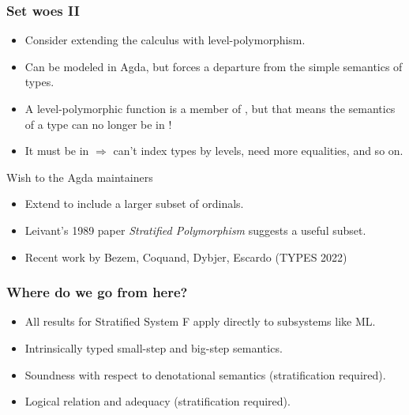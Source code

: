 \documentclass[dvipsnames,aspectratio=169,pdftex]{beamer}
\begin{document}
\begin{frame}
  \frametitle{Set woes II}
  \begin{itemize}
  \item Consider extending the calculus with level-polymorphism.
  \item Can be modeled in Agda, but forces a departure from the simple semantics of types.
  \item A level-polymorphic function is a member of , but that means the semantics of a type can no longer be in  !
  \item It must be in  $\Longrightarrow$ can't index types by levels, need more equalities, and so on.
  \end{itemize}
  \begin{exampleblock}{Wish to the  Agda maintainers}
    \begin{itemize}
    \item Extend  to include a larger subset of ordinals.
    \item Leivant's 1989 paper \emph{Stratified Polymorphism} suggests
      a useful subset.
    \item Recent work by Bezem, Coquand, Dybjer, Escardo (TYPES 2022)
    \end{itemize}
  \end{exampleblock}
\end{frame}
\begin{frame}
  \frametitle{Where do we go from here?}
  \begin{itemize}
  \item All results for Stratified System F apply directly to subsystems like ML.
  \item Intrinsically typed small-step and big-step semantics.
  \item Soundness with respect to denotational semantics (stratification required).
  \item Logical relation and adequacy (stratification required).
  \end{itemize}
\end{frame}
\end{document}
